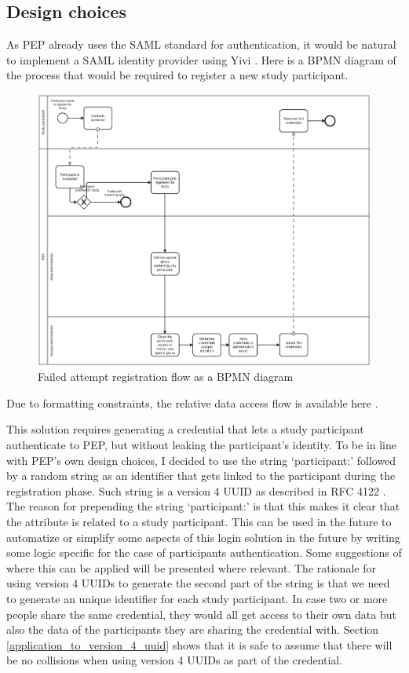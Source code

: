 \documentclass{report}
\begin{document}
\subsection{Design choices}\label{failed_attempt_design}
As PEP already uses the SAML standard \cite{sstc-saml-core-errata-2.0-wd-07} for authentication, it would be natural to implement a SAML identity provider using Yivi \cite{irma-app}.
Here is a BPMN diagram of the process that would be required to register a new study participant.

\begin{figure}[H]
	\includegraphics[scale=0.1]{registration_flow.png}
	\caption{Failed attempt registration flow as a BPMN diagram}
	\label{bpmn-registration-flow}
\end{figure}

Due to formatting constraints, the relative data access flow is available here \cite{data-access-failed-attempt-bpmn-diagram}.

This solution requires generating a credential that lets a study participant authenticate to PEP, but without leaking the participant's identity. To be in line with PEP's own
design choices, I decided to use the string \enquote*{participant:} followed by a random string as an identifier that gets linked to the participant during the registration phase. Such string is 
a version 4 UUID as described in RFC 4122 \cite{uuid_rfc}. The reason for prepending the string \enquote*{participant:} is that this makes it clear that the attribute is related to
a study participant. This can be used in the future to automatize or simplify some aspects of this login solution in the future by writing some logic specific for the case of
participants authentication. Some suggestions of where this can be applied will be presented where relevant. The rationale for using version 4 UUIDs to generate the second part of
the string is that we need to generate an unique identifier for each study participant. In case two or more people share the same credential, they would all get access to their own
data but also the data of the participants they are sharing the credential with. Section \ref{application_to_version_4_uuid} shows that it is safe to assume that there will be no 
collisions when using version 4 UUIDs as part of the credential.
\end{document}
